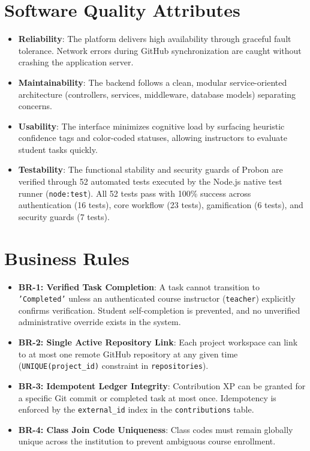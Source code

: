 \documentclass{scrreprt}
\begin{document}
\section{Software Quality Attributes}\label{sec:quality_attributes}
\begin{itemize}
    \item \textbf{Reliability}: The platform delivers high availability through graceful fault tolerance. Network errors during GitHub synchronization are caught without crashing the application server.
    \item \textbf{Maintainability}: The backend follows a clean, modular service-oriented architecture (controllers, services, middleware, database models) separating concerns.
    \item \textbf{Usability}: The interface minimizes cognitive load by surfacing heuristic confidence tags and color-coded statuses, allowing instructors to evaluate student tasks quickly.
    \item \textbf{Testability}: The functional stability and security guards of Probon are verified through 52 automated tests executed by the Node.js native test runner (\texttt{node:test}). All 52 tests pass with 100\% success across authentication (16 tests), core workflow (23 tests), gamification (6 tests), and security guards (7 tests).
\end{itemize}

\section{Business Rules}\label{sec:business_rules}
\begin{itemize}
    \item \textbf{BR-1: Verified Task Completion}: A task cannot transition to \texttt{'Completed'} unless an authenticated course instructor (\texttt{teacher}) explicitly confirms verification. Student self-completion is prevented, and no unverified administrative override exists in the system.
    \item \textbf{BR-2: Single Active Repository Link}: Each project workspace can link to at most one remote GitHub repository at any given time (\texttt{UNIQUE(project\_id)} constraint in \texttt{repositories}).
    \item \textbf{BR-3: Idempotent Ledger Integrity}: Contribution XP can be granted for a specific Git commit or completed task at most once. Idempotency is enforced by the \texttt{external\_id} index in the \texttt{contributions} table.
    \item \textbf{BR-4: Class Join Code Uniqueness}: Class codes must remain globally unique across the institution to prevent ambiguous course enrollment.
\end{itemize}
\end{document}
